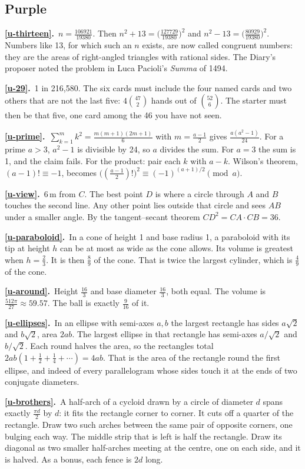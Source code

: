 \documentclass[11pt,a4paper]{article}
\newcounter{prob}
\newcommand{\ans}[2]{\par\smallskip\noindent\textbf{\ref{#1}.}\ #2}
\begin{document}
\subsection*{\color{bandpurple}Purple}
\ans{u-thirteen}{$n = \tfrac{106921}{19380}$. Then $n^2 + 13 = \bigl(\tfrac{127729}{19380}
\bigr)^2$ and $n^2 - 13 = \bigl(\tfrac{80929}{19380}\bigr)^2$. Numbers like 13, for
which such an $n$ exists, are now called congruent numbers: they are the areas of
right-angled triangles with rational sides. The Diary's proposer noted the problem in
Luca Pacioli's \textit{Summa} of 1494.}
\ans{u-29}{1 in 216{,}580. The six cards must include the four named cards and two
others that are not the last five: $4\binom{47}{2}$ hands out of $\binom{52}{6}$. The
starter must then be that five, one card among the 46 you have not seen.}
\ans{u-prime}{$\sum_{k=1}^{m}k^2 = \tfrac{m(m+1)(2m+1)}6$ with $m = \tfrac{a-1}2$ gives
$\tfrac{a(a^2-1)}{24}$. For a prime $a>3$, $a^2-1$ is divisible by 24, so $a$ divides the
sum. For $a = 3$ the sum is 1, and the claim fails. For the product: pair each $k$ with
$a-k$. Wilson's theorem, $(a-1)!\equiv-1$, becomes
$\bigl((\tfrac{a-1}2)!\bigr)^2 \equiv (-1)^{(a+1)/2} \pmod a$.}
\ans{u-view}{6\,m from $C$. The best point $D$ is where a circle through $A$ and $B$
touches the second line. Any other point lies outside that circle and sees $AB$ under a
smaller angle. By the tangent--secant theorem $CD^2 = CA\cdot CB = 36$.}
\ans{u-paraboloid}{In a cone of height 1 and base radius 1, a paraboloid with its tip at
height $h$ can be at most as wide as the cone allows. Its volume is greatest when $h =
\tfrac23$. It is then $\tfrac89$ of the cone. That is twice the largest cylinder, which is
$\tfrac49$ of the cone.}
\ans{u-around}{Height $\tfrac{16}3$ and base diameter $\tfrac{16}3$, both equal. The
volume is $\tfrac{512\pi}{27}\approx59.57$. The ball is exactly $\tfrac9{16}$ of it.}
\ans{u-ellipses}{In an ellipse with semi-axes $a, b$ the largest rectangle has sides
$a\sqrt2$ and $b\sqrt2$, area $2ab$. The largest ellipse in that rectangle has semi-axes
$a/\sqrt2$ and $b/\sqrt2$. Each round halves the area, so the rectangles total $2ab(1 +
\tfrac12 + \tfrac14 + \cdots) = 4ab$. That is the area of the rectangle round the first
ellipse, and indeed of every parallelogram whose sides touch it at the ends of two
conjugate diameters.}
\ans{u-brothers}{A half-arch of a cycloid drawn by a circle of diameter $d$ spans exactly
$\tfrac{\pi d}2$ by $d$: it fits the rectangle corner to corner. It cuts off a quarter of
the rectangle. Draw two such arches between the same pair of opposite corners, one bulging
each way. The middle strip that is left is half the rectangle. Draw its diagonal as two
smaller half-arches meeting at the centre, one on each side, and it is halved. As a bonus,
each fence is $2d$ long.}
\end{document}
